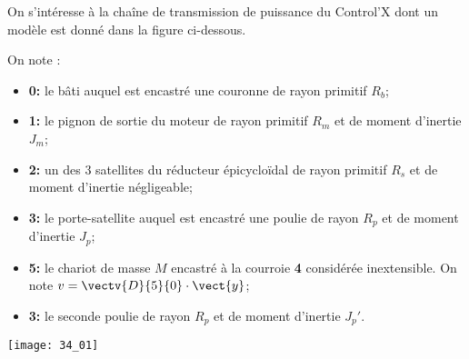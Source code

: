 \normaltrue \difficilefalse \tdifficilefalse
\correctionfalse

\setcounter{question}{0}
\ifcorrection
\else
{}
\fi

\ifprof
\else
On s'intéresse à la chaîne de transmission de puissance du Control'X dont un modèle est donné dans la figure ci-dessous.

On note : 
\begin{itemize}
\item \textbf{0:} le bâti auquel est encastré une couronne de rayon primitif $R_b$;
\item \textbf{1:} le pignon de sortie du moteur de rayon primitif $R_m$ et de moment d'inertie $J_m$;
\item \textbf{2:} un des 3 satellites du réducteur épicycloïdal de rayon primitif $R_s$ et de moment d'inertie négligeable;
\item \textbf{3:} le porte-satellite auquel est encastré une poulie de rayon $R_p$ et de moment d'inertie $J_p$;
\item \textbf{5:} le chariot de masse $M$ encastré à la courroie \textbf{4} considérée inextensible. On note $v=\vectv{D}{5}{0}\cdot \vect{y}$;
\item \textbf{3:} le seconde poulie de rayon $R_p$ et de moment d'inertie $J_p'$.
\end{itemize}

\begin{center}
\centering
\texttt{[image: 34\_01]}
\end{center}
\fi

\ifprof	
\else
\fi

\ifprof
\else
\fi



\ifprof	
\else
\fi

\ifprof
\else
{}
\fi